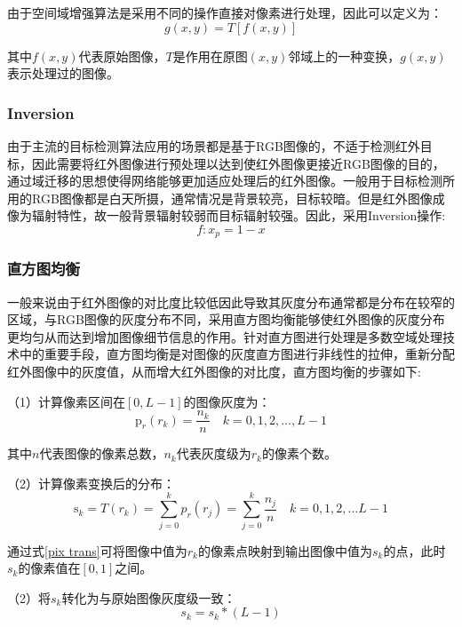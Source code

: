 由于空间域增强算法是采用不同的操作直接对像素进行处理，因此可以定义为：
\begin{equation}
  g(x, y)=T[f(x, y)]
\end{equation}

其中$f(x, y)$代表原始图像，$T$是作用在原图$(x, y)$邻域上的一种变换，$g(x, y)$表示处理过的图像。

\subsubsection{Inversion}
由于主流的目标检测算法应用的场景都是基于RGB图像的，不适于检测红外目标，因此需要将红外图像进行预处理以达到使红外图像更接近RGB图像的目的，通过域迁移的思想使得网络能够更加适应处理后的红外图像。一般用于目标检测所用的RGB图像都是白天所摄，通常情况是背景较亮，目标较暗。但是红外图像成像为辐射特性，故一般背景辐射较弱而目标辐射较强。因此，采用Inversion操作:
\begin{equation}
  f: x_{p}=1-x
\end{equation}

\subsubsection{直方图均衡}
一般来说由于红外图像的对比度比较低因此导致其灰度分布通常都是分布在较窄的区域，与RGB图像的灰度分布不同，采用直方图均衡能够使红外图像的灰度分布更均匀从而达到增加图像细节信息的作用。针对直方图进行处理是多数空域处理技术中的重要手段，直方图均衡是对图像的灰度直方图进行非线性的拉伸，重新分配红外图像中的灰度值，从而增大红外图像的对比度，直方图均衡的步骤如下: 

（1）计算像素区间在$[0,L-1]$的图像灰度为：
\begin{equation}
  \mathrm{p}_{r}\left(r_{k}\right)=\frac{n_{k}}{n} \quad k=0,1,2, \ldots, L-1
\end{equation}

其中$n$代表图像的像素总数，$n_{k}$代表灰度级为$r_{k}$的像素个数。

（2）计算像素变换后的分布：
\begin{equation}
  \mathrm{s}_{k}=T\left(r_{k}\right)=\sum_{j=0}^{k} p_{r}\left(r_{j}\right)=\sum_{j=0}^{k} \frac{n_{j}}{n} \quad k=0,1,2, \ldots L-1
  \label{pix trans}
\end{equation}

通过式\ref{pix trans}可将图像中值为$r_{k}$的像素点映射到输出图像中值为$s_{k}$的点，此时$s_{k}$的像素值在$[0,1]$之间。

（2）将$s_{k}$转化为与原始图像灰度级一致：
\begin{equation}
  s_{k}=s_{k} *(L-1)
\end{equation}

